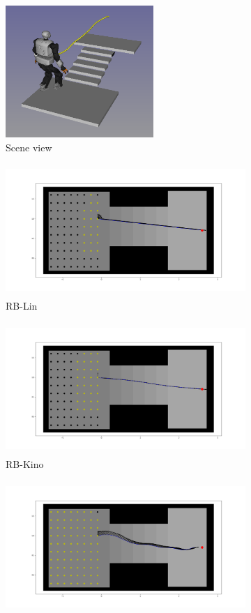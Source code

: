 \begin{figure}
    \centering
    \captionsetup[subfigure]{justification=centering}
    \begin{subfigure}[t]{0.49\linewidth}
    \includegraphics[width=\textwidth, height=5cm]{Figures/Chapter_LEAS/stairs_exemple.png}
    \caption{Scene view}
    \end{subfigure}
    \begin{subfigure}[t]{0.49\linewidth}
    \includegraphics[width=\textwidth, height=5cm]{Figures/Chapter_LEAS/stairs_lin_p1_90.png}
    \caption{RB-Lin}
    \end{subfigure}
    \begin{subfigure}[t]{0.49\linewidth}
    \includegraphics[width=\textwidth, height=5cm]{Figures/Chapter_LEAS/stairs_kino_p1_90.png}
    \caption{RB-Kino}
    \end{subfigure}
    \begin{subfigure}[t]{0.49\linewidth}
    \includegraphics[width=\textwidth, height=5cm]{Figures/Chapter_LEAS/stairs_leas_p1_90.png}

\end{subfigure}
\end{figure}
